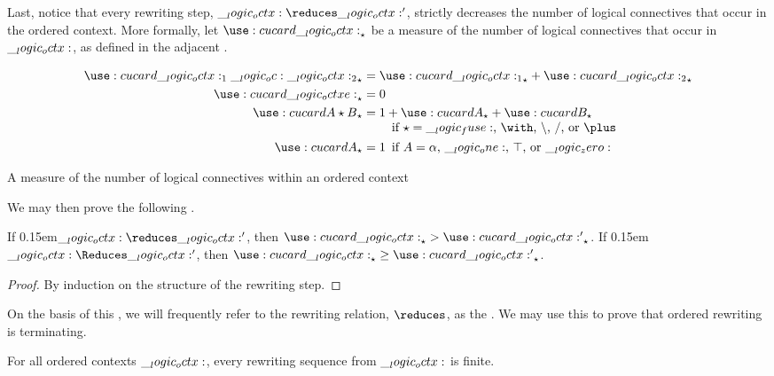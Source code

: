 Last, notice that every rewriting step, $\octx \reduces \octx'$, strictly decreases the number of logical connectives that occur in the ordered context.
More formally, let $\card{\octx}_{\star}$ be a measure of the number of logical connectives that occur in $\__logic_octx:$, as defined in the adjacent .
%
\begin{marginfigure}
  \begin{align*}
    \card{\octx_1 \oc \octx_2}_{\star} &= \card{\octx_1}_{\star} + \card{\octx_2}_{\star} \\
    \card{\octxe}_{\star} &= 0 \\
    \card{A \star B}_{\star} &= \begin{tabular}[t]{@{}l@{}}
                          $1 + \card{A}_{\star} + \card{B}_{\star}$ \\
                          \quad if $\mathord{\star} = \mathord{\fuse}$, $\mathord{\with}$, $\mathord{\limp}$, $\mathord{\pmir}$, or $\mathord{\plus}$
                         \end{tabular} \\
    \card{A}_{\star} &= \mathrlap{1}
                    \quad \text{if $A = \alpha$, $\one$, $\top$, or $\zero$}
  \end{align*}
  \caption{A measure of the number of logical connectives within an ordered context}\label{fig:ordered-rewriting:measure}
\end{marginfigure}%
%
We may then prove the following .%
%
\begin{lemma}\label{lem:ordered-rewriting:reduction}
  If \kern0.15em$\octx \reduces \octx'$, then $\card{\octx}_{\star} > \card{\octx'}_{\star}$.
  If \kern0.15em$\octx \Reduces \octx'$, then $\card{\octx}_{\star} \geq \card{\octx'}_{\star}$.
\end{lemma}
%
\begin{proof}
  By induction on the structure of the rewriting step.
\end{proof}
%
\noindent
On the basis of this , we will frequently refer to the rewriting relation, $\reduces$, as the .
We may use this  to prove that ordered rewriting is terminating.
% 
%
\begin{theorem}[Termination]\label{thm:ordered-rewriting:termination}
  For all ordered contexts $\__logic_octx:$, every rewriting sequence from $\__logic_octx:$ is finite.
\end{theorem}
